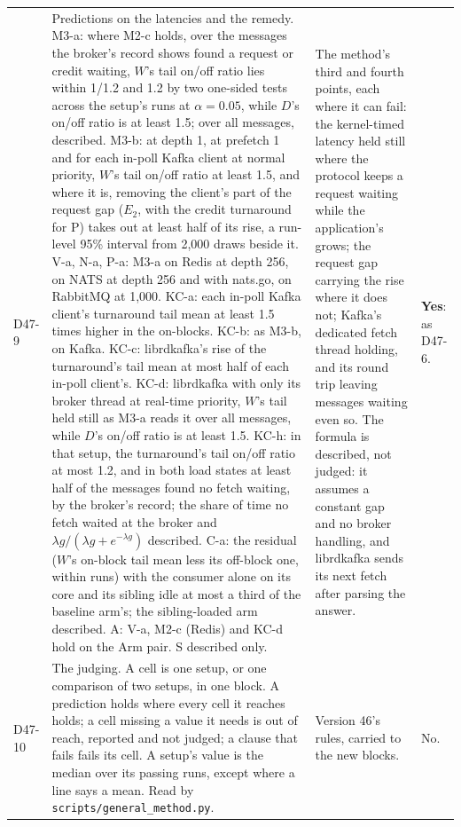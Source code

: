 \documentclass[11pt]{article}
\begin{document}
{\begin{longtable}{@{}p{1.1cm} >{\raggedright\arraybackslash}p{6.1cm} >{\raggedright\arraybackslash}p{6.0cm} >{\raggedright\arraybackslash}p{2.2cm}@{}}
D47-9 & Predictions on the latencies and the remedy. M3-a: where M2-c holds, over the messages the broker's record shows found a request or credit waiting, $W$'s tail on/off ratio lies within 1/1.2 and 1.2 by two one-sided tests across the setup's runs at $\alpha = 0.05$, while $D$'s on/off ratio is at least 1.5; over all messages, described. M3-b: at depth 1, at prefetch 1 and for each in-poll Kafka client at normal priority, $W$'s tail on/off ratio at least 1.5, and where it is, removing the client's part of the request gap ($E_2$, with the credit turnaround for P) takes out at least half of its rise, a run-level 95\% interval from 2,000 draws beside it. V-a, N-a, P-a: M3-a on Redis at depth 256, on NATS at depth 256 and with nats.go, on RabbitMQ at 1,000. KC-a: each in-poll Kafka client's turnaround tail mean at least 1.5 times higher in the on-blocks. KC-b: as M3-b, on Kafka. KC-c: librdkafka's rise of the turnaround's tail mean at most half of each in-poll client's. KC-d: librdkafka with only its broker thread at real-time priority, $W$'s tail held still as M3-a reads it over all messages, while $D$'s on/off ratio is at least 1.5. KC-h: in that setup, the turnaround's tail on/off ratio at most 1.2, and in both load states at least half of the messages found no fetch waiting, by the broker's record; the share of time no fetch waited at the broker and $\lambda g/(\lambda g + e^{-\lambda g})$ described. C-a: the residual ($W$'s on-block tail mean less its off-block one, within runs) with the consumer alone on its core and its sibling idle at most a third of the baseline arm's; the sibling-loaded arm described. A: V-a, M2-c (Redis) and KC-d hold on the Arm pair. S described only. & The method's third and fourth points, each where it can fail: the kernel-timed latency held still where the protocol keeps a request waiting while the application's grows; the request gap carrying the rise where it does not; Kafka's dedicated fetch thread holding, and its round trip leaving messages waiting even so. The formula is described, not judged: it assumes a constant gap and no broker handling, and librdkafka sends its next fetch after parsing the answer. & \textbf{Yes}: as D47-6. \\
D47-10 & The judging. A cell is one setup, or one comparison of two setups, in one block. A prediction holds where every cell it reaches holds; a cell missing a value it needs is out of reach, reported and not judged; a clause that fails fails its cell. A setup's value is the median over its passing runs, except where a line says a mean. Read by \texttt{scripts/general\_method.py}. & Version 46's rules, carried to the new blocks. & No. \\

\end{longtable}}
\end{document}
